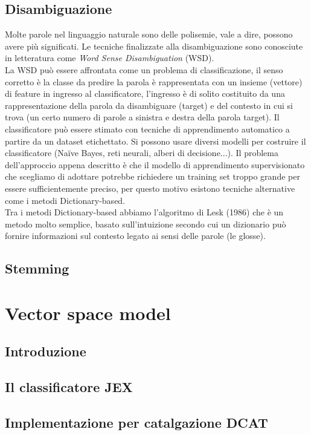 \documentclass{article}
\theoremstyle{plain}
\theoremstyle{definition}
\begin{document}
\subsection{Disambiguazione}
Molte parole nel linguaggio naturale sono delle polisemie, vale a dire, possono avere più significati. Le tecniche finalizzate alla disambiguazione sono conosciute in letteratura come \textit{Word Sense Disambiguation} (WSD).
\\
La WSD può essere affrontata come un problema di classificazione, il senso corretto è la classe da predire la parola è rappresentata con un insieme (vettore) di feature in ingresso al classificatore, l'ingresso è di solito costituito da una rappresentazione della parola da disambiguare (target) e del contesto in cui si trova (un certo numero di parole a sinistra e destra della parola target). Il classificatore può essere stimato con tecniche di apprendimento automatico a partire da un dataset etichettato. Si possono usare diversi modelli per costruire il classificatore (Naïve Bayes, reti neurali, alberi di decisione...).
Il problema dell'approccio appena descritto è che il modello di apprendimento supervisionato che scegliamo di adottare potrebbe richiedere un training set troppo grande per essere sufficientemente preciso, per questo motivo esistono tecniche alternative come i metodi Dictionary-based.
\\
Tra i metodi Dictionary-based abbiamo l'algoritmo di Lesk (1986) che è un metodo molto semplice, basato sull'intuizione secondo cui un dizionario può fornire informazioni sul contesto legato ai sensi delle parole (le glosse).  

 
\subsection{Stemming}



\newpage
\section{Vector space model}
\subsection{Introduzione}
\subsection{Il classificatore JEX}
\subsection{Implementazione per catalgazione DCAT}
\end{document}
